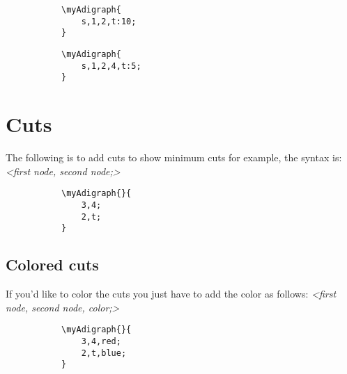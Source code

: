 \documentclass{report}
\begin{document}
\begin{figure}
	\begin{subfigure}{0.49\textwidth}
		\begin{verbatim}
\myAdigraph{
	s,1,2,t:10;
}
\end{verbatim}
	\end{subfigure}
	\begin{subfigure}{0.49\textwidth}
	\end{subfigure}
\end{figure}

\begin{figure}
	\begin{subfigure}{0.49\textwidth}
		\begin{verbatim}
\myAdigraph{
	s,1,2,4,t:5;
}
\end{verbatim}
	\end{subfigure}
	\begin{subfigure}{0.49\textwidth}
	\end{subfigure}
\end{figure}

\section{Cuts}

The following is to add cuts to show minimum cuts for example, the syntax is: \textit{<first node, second node;>}

\begin{figure}
	\begin{subfigure}{0.49\textwidth}
		\begin{verbatim}
\myAdigraph{}{
	3,4;
	2,t;
}
\end{verbatim}
	\end{subfigure}
	\begin{subfigure}{0.49\textwidth}
	\end{subfigure}
\end{figure}

\subsection{Colored cuts}
If you'd like to color the cuts you just have to add the color as follows: \textit{<first node, second node, color;>}

\begin{figure}
	\begin{subfigure}{0.49\textwidth}
		\begin{verbatim}
\myAdigraph{}{
	3,4,red;
	2,t,blue;
}
\end{verbatim}
	\end{subfigure}
	\begin{subfigure}{0.49\textwidth}
	\end{subfigure}
\end{figure}
\end{document}
